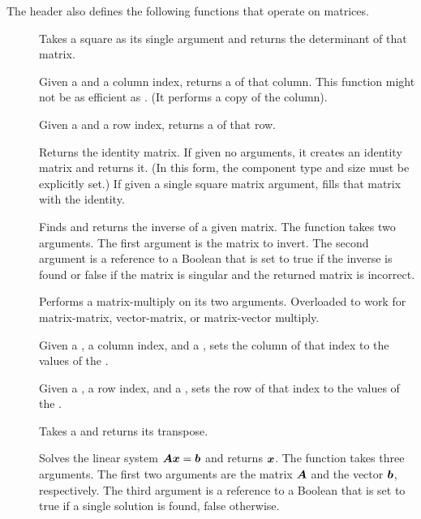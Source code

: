 
The  header also defines the following functions
that operate on matrices.

\begin{description}
\item[]  Takes a square
   as its single argument and returns the
  determinant of that matrix.
\item[]  Given a
   and a column index, returns a  of that
  column. This function might not be as efficient as . (It
  performs a copy of the column).
\item[]  Given a  and
  a row index, returns a  of that row.
\item[]  Returns the
  identity matrix. If given no arguments, it creates an identity matrix and
  returns it. (In this form, the component type and size must be explicitly
  set.) If given a single square matrix argument, fills that matrix with
  the identity.
\item[]  Finds and returns the
  inverse of a given matrix. The function takes two arguments. The first
  argument is the matrix to invert. The second argument is a reference to a
  Boolean that is set to true if the inverse is found or false if the
  matrix is singular and the returned matrix is incorrect.
\item[] Performs a matrix-multiply on its two
  arguments. Overloaded to work for matrix-matrix, vector-matrix, or
  matrix-vector multiply.
\item[] Given a , a column
  index, and a , sets the column of that index to the values of
  the .
\item[] Given a , a row index,
  and a , sets the row of that index to the values of the
  .
\item[]  Takes a
   and returns its transpose.
\item[]  Solves the linear
  system $\matrixsym{A}\vectorsym{x} = \vectorsym{b}$ and returns
  $\vectorsym{x}$. The function takes three arguments. The first two
  arguments are the matrix $\matrixsym{A}$ and the vector $\vectorsym{b}$,
  respectively. The third argument is a reference to a Boolean that is set
  to true if a single solution is found, false otherwise.
\end{description}

